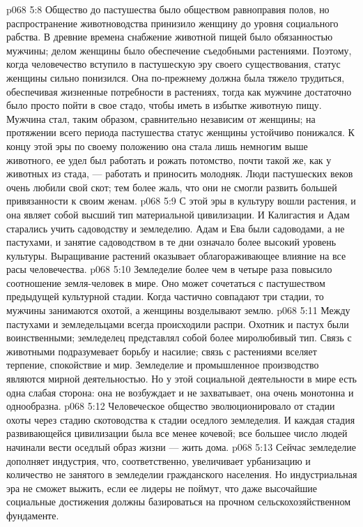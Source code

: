 \vs p068 5:8 Общество до пастушества было обществом равноправия полов, но распространение животноводства принизило женщину до уровня социального рабства. В древние времена снабжение животной пищей было обязанностью мужчины; делом женщины было обеспечение съедобными растениями. Поэтому, когда человечество вступило в пастушескую эру своего существования, статус женщины сильно понизился. Она по\hyp{}прежнему должна была тяжело трудиться, обеспечивая жизненные потребности в растениях, тогда как мужчине достаточно было просто пойти в свое стадо, чтобы иметь в избытке животную пищу. Мужчина стал, таким образом, сравнительно независим от женщины; на протяжении всего периода пастушества статус женщины устойчиво понижался. К концу этой эры по своему положению она стала лишь немногим выше животного, ее удел был работать и рожать потомство, почти такой же, как у животных из стада, --- работать и приносить молодняк. Люди пастушеских веков очень любили свой скот; тем более жаль, что они не смогли развить большей привязанности к своим женам.
\vs p068 5:9 \bibnobreakspace {} С этой эры в культуру вошли растения, и она являет собой высший тип материальной цивилизации. И Калигастия и Адам старались учить садоводству и земледелию. Адам и Ева были садоводами, а не пастухами, и занятие садоводством в те дни означало более высокий уровень культуры. Выращивание растений оказывает облагораживающее влияние на все расы человечества.
\vs p068 5:10 Земледелие более чем в четыре раза повысило соотношение земля\hyp{}человек в мире. Оно может сочетаться с пастушеством предыдущей культурной стадии. Когда частично совпадают три стадии, то мужчины занимаются охотой, а женщины возделывают землю.
\vs p068 5:11 Между пастухами и земледельцами всегда происходили распри. Охотник и пастух были воинственными; земледелец представлял собой более миролюбивый тип. Связь с животными подразумевает борьбу и насилие; связь с растениями вселяет терпение, спокойствие и мир. Земледелие и промышленное производство являются мирной деятельностью. Но у этой социальной деятельности в мире есть одна слабая сторона: она не возбуждает и не захватывает, она очень монотонна и однообразна.
\vs p068 5:12 \pc Человеческое общество эволюционировало от стадии охоты через стадию скотоводства к стадии оседлого земледелия. И каждая стадия развивающейся цивилизации была все менее кочевой; все большее число людей начинали вести оседлый образ жизни --- жить дома.
\vs p068 5:13 Сейчас земледелие дополняет индустрия, что, соответственно, увеличивает урбанизацию и количество не занятого в земледелии гражданского населения. Но индустриальная эра не сможет выжить, если ее лидеры не поймут, что даже высочайшие социальные достижения должны базироваться на прочном сельскохозяйственном фундаменте.
